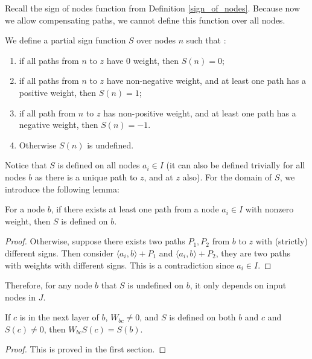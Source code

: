 				Recall the sign of nodes function from Definition \ref{sign_of_nodes}. Because now we allow compensating paths, we cannot define this function over all nodes.
				
				
				
				
				\begin{definition}\label{sign_of_nodes_in_I_2}
					We define a partial sign function $S$ over nodes $n$ such that : 	
					\begin{enumerate} 
						\item if all paths from $n$ to $z$ have 0 weight, then $S(n)=0$; 
						\item if all paths from $n$ to $z$ have non-negative weight, and at least one path has a positive weight, then $S(n)=1$; 
						\item if all path from $n$ to $z$ has non-positive weight, and at least one path has a negative weight, then $S(n)=-1$.
						\item Otherwise $S(n)$ is undefined.
					\end{enumerate}
				\end{definition}	
				
				Notice that $S$ is defined on all nodes $a_i \in I$ (it can also be defined trivially for all nodes $b$ as there is a unique path to $z$, and at $z$ also). For the domain of $S$, we introduce the following lemma:
				
				\begin{lemma}\label{lem:sign}
					For a node $b$, if there exists at least one path from a node $a_i\in I$ with nonzero weight, then  $S$ is defined on $b$.
				\end{lemma}
				
				\begin{proof}
					Otherwise, suppose there exists two paths $P_1,P_2$ from $b$ to $z$ with (strictly) different signs. Then consider $\langle a_i,b\rangle+P_1$ and $\langle a_i,b\rangle+P_2$, they are two paths with weights with different signs. This is a contradiction since $a_i\in I$.
				\end{proof}
				Therefore, for any node $b$  that $S$ is undefined on $b$, it only depends on input nodes in $J$.  
				
				\begin{lemma}
					If $c$ is in the next layer of $b$, $W_{bc}\neq 0$, and $S$ is defined on both $b$ and $c$ and $S(c)\neq 0$, then $W_{bc}S(c)=S(b)$.
				\end{lemma}
				
				\begin{proof}
					This is proved in the first section.
				\end{proof}
				
